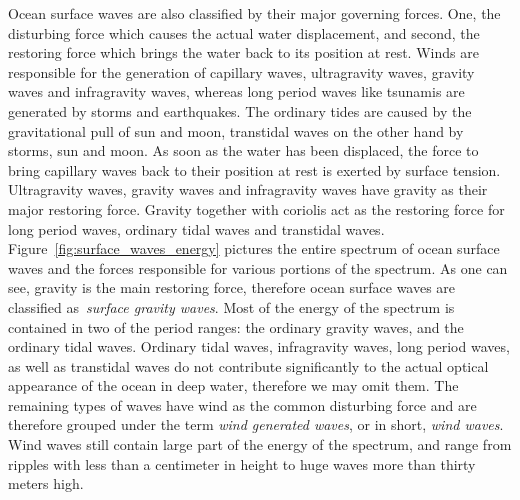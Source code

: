 Ocean surface waves are also classified by their major governing forces.
One, the disturbing force which causes the actual water displacement,
and second, the restoring force which brings the water back to its position
at rest. Winds are responsible for the generation of capillary waves,
ultragravity waves, gravity waves and infragravity waves, whereas long
period waves like tsunamis are generated by storms and earthquakes.
The ordinary tides are caused by the gravitational pull of sun
and moon, transtidal waves on the other hand by storms, sun and moon.
As soon as the water has been displaced, the force to bring capillary
waves back to their position at rest is exerted by surface tension.
Ultragravity waves, gravity waves and infragravity waves have gravity
as their major restoring force. Gravity together with coriolis act
as the restoring force for long period waves, ordinary tidal waves and
transtidal waves.
Figure~\ref{fig:surface_waves_energy} pictures the entire spectrum
of ocean surface waves and the forces responsible for various portions
of the spectrum. As one can see, gravity is the main restoring force,
therefore ocean surface waves are classified as~\emph{surface gravity waves}.
Most of the energy of the spectrum is contained in two of the period
ranges: the ordinary gravity waves, and the ordinary tidal waves.
Ordinary tidal waves, infragravity waves, long period waves, as well as
transtidal waves do not contribute significantly to the actual optical
appearance of the ocean in deep water, therefore we may omit them.
The remaining types of waves have wind as the common disturbing force
and are therefore grouped under the term \emph{wind generated waves},
or in short, \emph{wind waves}. Wind waves still contain large part of
the energy of the spectrum, and range from ripples with less than a
centimeter in height to huge waves more than thirty meters high.

